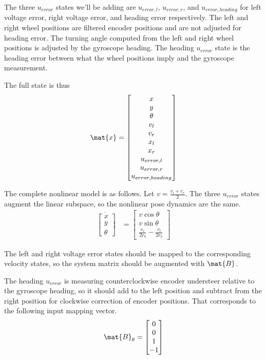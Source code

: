 The three $u_{error}$ states we'll be adding are $u_{error,l}$, $u_{error,r}$,
and $u_{error,heading}$ for left voltage error, right voltage error, and heading
error respectively. The left and right wheel positions are filtered encoder
positions and are not adjusted for heading error. The turning angle computed
from the left and right wheel positions is adjusted by the gyroscope heading.
The heading $u_{error}$ state is the heading error between what the wheel
positions imply and the gyroscope measurement.

The full state is thus
\begin{equation*}
  \mat{x} =
  \begin{bmatrix}
    x \\
    y \\
    \theta \\
    v_l \\
    v_r \\
    x_l \\
    x_r \\
    u_{error,l} \\
    u_{error,r} \\
    u_{error,heading}
  \end{bmatrix}
\end{equation*}

The complete nonlinear model is as follows. Let $v = \frac{v_l + v_r}{2}$. The
three $u_{error}$ states augment the linear subspace, so the nonlinear pose
dynamics are the same.
\begin{align}
  \dot{\begin{bmatrix}
    x \\
    y \\
    \theta
  \end{bmatrix}} &=
    \begin{bmatrix}
      v\cos\theta \\
      v\sin\theta \\
      \frac{v_r}{2r_b} - \frac{v_l}{2r_b}
    \end{bmatrix}
\end{align}

The left and right voltage error states should be mapped to the corresponding
velocity states, so the system matrix should be augmented with $\mat{B}$.

The heading $u_{error}$ is measuring counterclockwise encoder understeer
relative to the gyroscope heading, so it should add to the left position and
subtract from the right position for clockwise correction of encoder positions.
That corresponds to the following input mapping vector.
\begin{equation*}
  \mat{B}_{\theta} = \begin{bmatrix}
    0 \\
    0 \\
    1 \\
    -1
  \end{bmatrix}
\end{equation*}

